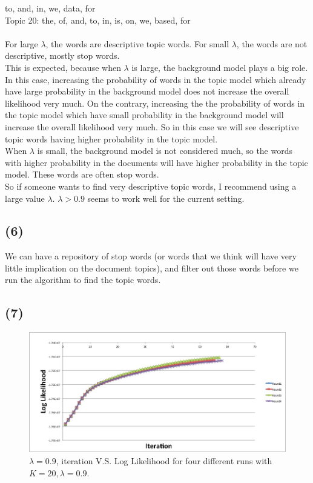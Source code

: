 to,
and,
in,
we,
data,
for
\\
Topic 20:
the,
of,
and,
to,
in,
is,
on,
we,
based,
for
\\ \\
For large $\lambda$, the words are descriptive topic words. For small $\lambda$, the words are not descriptive, mostly stop words. \\
This is expected, because when $\lambda$ is large, the background model plays a big role. In this case, increasing the probability of words in the topic model which already have large probability in the background model does not increase the overall likelihood very much. On the contrary, increasing the the probability of words in the topic model which have small probability in the background model will increase the overall likelihood very much. So in this case we will see descriptive topic words having higher probability in the topic model.  \\
When $\lambda$ is small, the background model is not considered much, so the words with higher probability in the documents will have higher probability in the topic model. These words are often stop words. \\
So if someone wants to find very descriptive topic words, I recommend using a large value $\lambda$. $\lambda>0.9$ seems to work well for the current setting. 

\subsection*{(6)}
We can have a repository of stop words (or words that we think will have very little implication on the document topics), and filter out those words before we run the algorithm to find the topic words. 

\subsection*{(7)}

\begin{figure}[!ht]
  \centering
    \includegraphics[width=\textwidth]{4RoundsLogLikelihood.jpg}
      \caption{$\lambda = 0.9$, iteration V.S. Log Likelihood for four different runs with $K=20, \lambda=0.9$.}
\end{figure}


